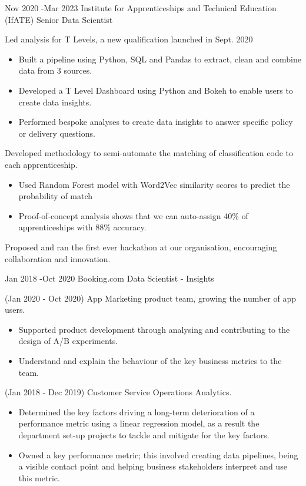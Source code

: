 \documentclass[10pt]{article} %
\begin{document}
\job
{Nov 2020 -}{Mar 2023}
{Institute for Apprenticeships and Technical Education (IfATE)}
{}
{Senior Data Scientist}
{
  \begin{itemize-noindent}
  \item{Led analysis for T Levels, a new qualification launched in Sept. 2020}
    \begin{itemize}
    \item{Built a pipeline using Python, SQL and Pandas to extract, clean and combine data from 3 sources.}
    \item{Developed a T Level Dashboard using Python and Bokeh to enable users to create data insights.}
    \item{Performed bespoke analyses to create data insights to answer specific policy or delivery questions.}
    \end{itemize}
  \item{Developed methodology to semi-automate the matching of classification code to each apprenticeship.}
    \begin{itemize}
    \item{Used Random Forest model with Word2Vec similarity scores to predict the probability of match}
    \item{Proof-of-concept analysis shows that we can auto-assign 40\% of apprenticeships with 88\% accuracy.}
    \end{itemize}
  \item{Proposed and ran the first ever hackathon at our organisation, encouraging collaboration and innovation.}
  \end{itemize-noindent}
}

\job
{Jan 2018 -}{Oct 2020}
{Booking.com}
{}
{Data Scientist - Insights}
{
  \begin{itemize-noindent}
  \item{(Jan 2020 - Oct 2020) App Marketing product team, growing the number of app users.}
    \begin{itemize}
    \item{Supported product development through analysing and contributing to the design of A/B experiments.}
    \item{Understand and explain the behaviour of the key business metrics to the team.}
    \end{itemize}
  \item{(Jan 2018 - Dec 2019) Customer Service Operations Analytics.}
    \begin{itemize}
    \item{Determined the key factors driving a long-term deterioration of a performance metric using a linear
          regression model, as a result the department set-up projects to tackle and mitigate for the key factors.}
    \item{Owned a key performance metric; this involved creating data pipelines, being a visible contact point
          and helping business stakeholders interpret and use this metric.}
    \end{itemize}
  \end{itemize-noindent}
}
\end{document}
